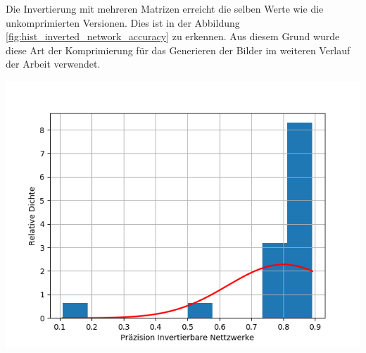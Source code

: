 \documentclass[Interploate_hadwritten_Digits.tex]{subfiles}
\begin{document}
	Die Invertierung mit mehreren Matrizen erreicht die selben Werte wie die unkomprimierten Versionen. Dies ist in der Abbildung \ref{fig:hist_inverted_network_accuracy} zu erkennen. Aus diesem Grund wurde diese Art der Komprimierung für das Generieren der Bilder im weiteren Verlauf der Arbeit verwendet.
	\begin{Figure}
		\centering
		\includegraphics[width=\linewidth]{img/results/histogram_inverted_network_accuracy.png}
		\label{fig:hist_inverted_network_accuracy}
	\end{Figure}
	
\end{document}
